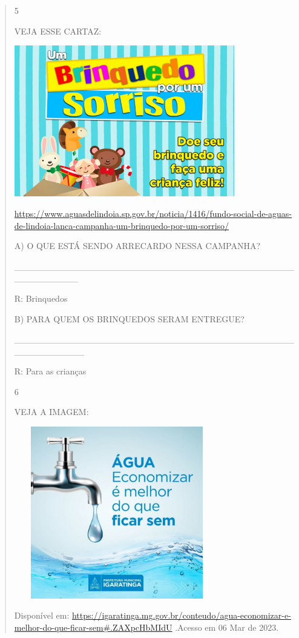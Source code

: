 {{{{\begin{verse}
{{\begin{escolha}
{{{{{\num{5}

VEJA ESSE CARTAZ:

\includegraphics[width=3.78169in,height=2.59560in]{media/image132.jpeg}

\url{https://www.aguasdelindoia.sp.gov.br/noticia/1416/fundo-social-de-aguas-de-lindoia-lanca-campanha-um-brinquedo-por-um-sorriso/}

A) O QUE ESTÁ SENDO ARRECARDO NESSA CAMPANHA?

\_\_\_\_\_\_\_\_\_\_\_\_\_\_\_\_\_\_\_\_\_\_\_\_\_\_\_\_\_\_\_\_\_\_\_\_\_\_\_\_\_\_\_\_\_\_\_\_\_\_\_\_\_\_

R: Brinquedos

B) PARA QUEM OS BRINQUEDOS SERAM ENTREGUE?

\_\_\_\_\_\_\_\_\_\_\_\_\_\_\_\_\_\_\_\_\_\_\_\_\_\_\_\_\_\_\_\_\_\_\_\_\_\_\_\_\_\_\_\_\_\_\_\_\_\_\_\_\_\_\_

R: Para as crianças

\num{6}

VEJA A IMAGEM:

\includegraphics[width=3.52778in,height=2.95347in]{media/image133.jpeg}

Disponível em:
\url{https://igaratinga.mg.gov.br/conteudo/agua-economizar-e-melhor-do-que-ficar-sem\#.ZAXpcHbMIdU}
.Acesso em 06 Mar de 2023.

}}}}}
\end{escolha}}}
\end{verse}}}}}
